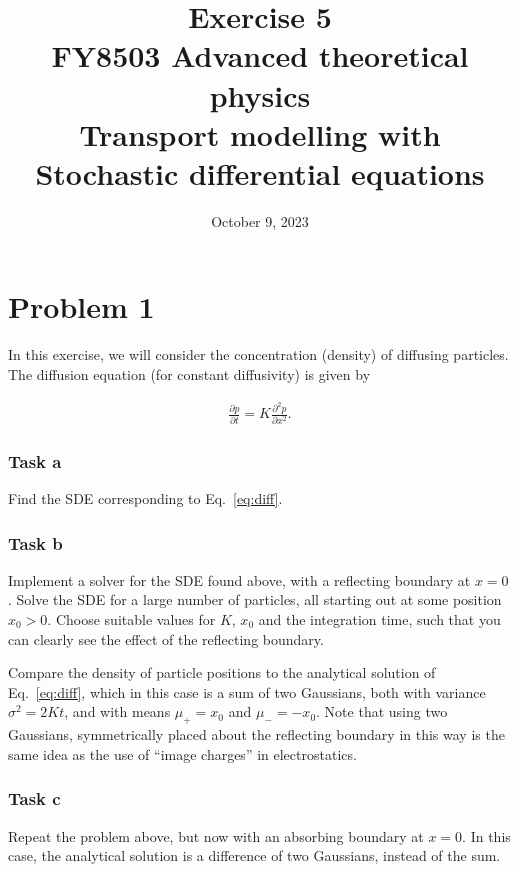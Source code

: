 \documentclass[a4paper]{article}
\title{\vspace{-3em} Exercise 5\\[10pt] \large FY8503 Advanced theoretical physics\\  Transport modelling with Stochastic differential equations}
\author{October 9, 2023}
\date{}
\begin{document}
\maketitle



\section*{Problem 1}

In this exercise, we will consider the concentration (density) of diffusing particles. The diffusion equation (for constant diffusivity) is given by

\begin{align}
    \label{eq:diff}
    \frac{\partial p}{\partial t} = K \frac{\partial^2 p}{\partial x^2}.
\end{align}


\subsubsection*{Task a}

Find the SDE corresponding to Eq.~\eqref{eq:diff}.

\subsubsection*{Task b}

Implement a solver for the SDE found above, with a reflecting boundary at $x=0$. Solve the SDE for a large number of particles, all starting out at some position $x_0 > 0$. Choose suitable values for $K$, $x_0$ and the integration time, such that you can clearly see the effect of the reflecting boundary.

Compare the density of particle positions to the analytical solution of Eq.~\eqref{eq:diff}, which in this case is a sum of two Gaussians, both with variance $\sigma^2=2Kt$, and with means $\mu_+ = x_0$ and $\mu_- = -x_0$. Note that using two Gaussians, symmetrically placed about the reflecting boundary in this way is the same idea as the use of ``image charges'' in electrostatics.

\subsubsection*{Task c}

Repeat the problem above, but now with an absorbing boundary at $x=0$. In this case, the analytical solution is a difference of two Gaussians, instead of the sum.
\end{document}
